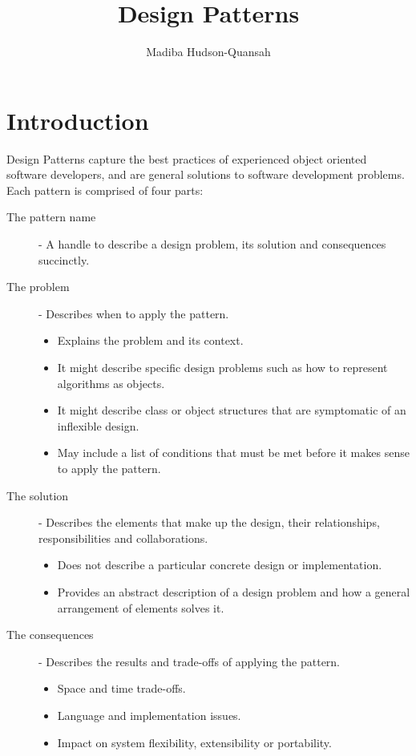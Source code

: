 \documentclass[12pt letter]{report}
\title{\Huge{Design Patterns}}
\author{\huge{Madiba Hudson-Quansah}}
\date{}
\begin{document}
\maketitle
\newpage
{}
\tableofcontents
\pagebreak

\chapter{Introduction}

Design Patterns capture the best practices of experienced object oriented software developers, and are
general solutions to software development problems. Each pattern is comprised of four parts:

\begin{description}
  \item [ The pattern name ] - A handle to describe a design problem, its solution and consequences succinctly.
  \item [ The problem ] - Describes when to apply the pattern.
        \begin{itemize}
          \item Explains the problem and its context.
          \item It might describe specific design problems such as how to represent algorithms as objects.
          \item It might describe class or object structures that are symptomatic of an inflexible design.
          \item May include a list of conditions that must be met before it makes sense to apply the pattern.
        \end{itemize}
  \item [ The solution ] - Describes the elements that make up the design, their relationships, responsibilities and collaborations.
        \begin{itemize}
          \item Does not describe a particular concrete design or implementation.
          \item Provides an abstract description of a design problem and how a general arrangement of elements solves it.
        \end{itemize}
  \item [ The consequences ] - Describes the results and trade-offs of applying the pattern.
        \begin{itemize}
          \item Space and time trade-offs.
          \item Language and implementation issues.
          \item Impact on system flexibility, extensibility or portability.
        \end{itemize}
\end{description}
\end{document}
